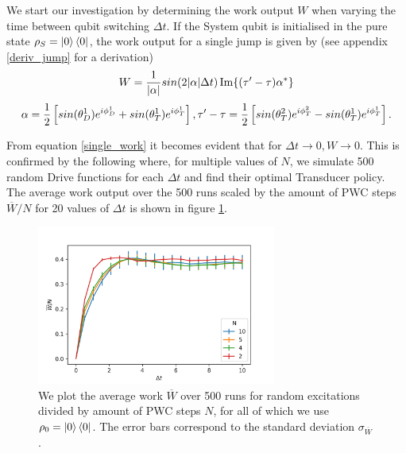 We start our investigation by determining the work output $W$ when varying the time between qubit switching $\Delta t$.
If the System qubit is initialised in the pure state $\rho_S = \ket{0} \bra{0}$, the work output for a single jump is given by (see appendix \ref{deriv_jump} for a derivation)
\begin{equation} \label{single_work}
	W = \frac{1}{\abs{\alpha}} sin(2\abs{\alpha}\Delta t) \Im{(\tau' - \tau) \alpha^*}
\end{equation}
\begin{equation*}
	\alpha = \frac{1}{2} \left[sin(\theta_D^1) e^{i\phi_D^1} + sin(\theta_T^1) e^{i\phi_T^1}\right], \\
	\tau' - \tau = \frac{1}{2} \left[ sin(\theta_T^2)e^{i\phi_T^2} - sin(\theta_T^1)e^{i\phi_T^1} \right].
\end{equation*}

From equation \ref{single_work} it becomes evident that for $\Delta t \to 0, W \to 0$. This is confirmed by the following where, for multiple values of $N$, we simulate 500 random Drive functions for each $\Delta t$ and find their optimal Transducer policy. The average work output over the 500 runs scaled by the amount of PWC steps $\overline{W}/N$ for 20 values of $\Delta t$ is shown in figure \ref{dt_dep}.

\begin{figure}
	\centering
	\includegraphics[width=0.7\textwidth]{img/dt_dep}
	\caption{We plot the average work $\overline{W}$ over 500 runs for random excitations divided by amount of PWC steps $N$, for all of which we use $\rho_0 = \ket{0}\bra{0}$. The error bars correspond to the standard deviation $\sigma_{\overline{W}}$.}
	\label{dt_dep}
\end{figure}